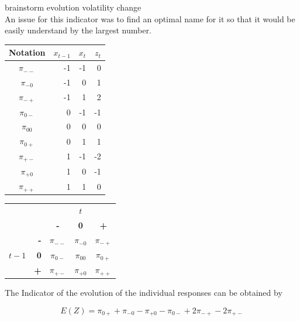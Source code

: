 \documentclass[12pt,a4paper,oneside]{book}
\begin{document}
brainstorm
 evolution
 volatility
 change \\
 
 An issue for this indicator was to find an optimal name for it so that it would be easily understand by the largest number. \\

\begin{center}
\begin{tabular}{|c|r|r|r|}
Notation    &  $x_{t-1}$ & $x_t$ & $z_t$ \\\hline
$\pi_{--}$    &  -1  & -1    & 0 \\
$\pi_{-0}$    &  -1  & 0     & 1 \\
$\pi_{-+}$    &  -1  & 1     & 2 \\
$\pi_{0-}$    &  0   & -1    & -1 \\
$\pi_{00}$    &  0   & 0     & 0 \\
$\pi_{0+}$    &  0   & 1     & 1 \\
$\pi_{+-}$    &  1   & -1    & -2 \\
$\pi_{+0}$    &  1   & 0     & -1 \\
$\pi_{++}$    &  1   & 1     & 0 \\
\end{tabular}  
\end{center}

\begin{center}
\begin{tabular}{r | r | c c c | }
\multicolumn{1}{r}{} & \multicolumn{1}{r}{} &	\multicolumn{3}{c}{$t$} \\ \cline{3-5}
\multicolumn{1}{r}{} & 		& \textbf{-} & \textbf{0} & \textbf{+} \\ \cline{2-5}
		&    \textbf{-} & $\pi_{--}$	& $\pi_{-0}$	& $\pi_{-+}$ \\ 
$t-1$ & \textbf{0} & $\pi_{0-}$	& $\pi_{00}$	& $\pi_{0+}$	\\
		&    \textbf{+} & $\pi_{+-}$	& $\pi_{+0}$	& $\pi_{++}$ \\ \cline{2-5}
\end{tabular}    
\end{center}



The Indicator of the evolution of the individual responses can be obtained by

\begin{equation}
E(Z) = \pi_{0+} + \pi_{-0} - \pi_{+0} - \pi_{0-} +2\pi_{-+} -2\pi_{+-} 
\end{equation}
\end{document}
